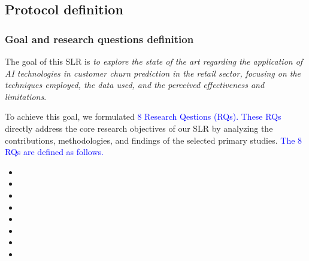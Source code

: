 \subsection{Protocol definition}
\label{subsec:protocol-definition}

\subsubsection{Goal and research questions definition} 
The goal of this SLR is \textit{to explore the state of the art regarding the application of AI technologies in customer churn prediction in the retail sector, focusing on the techniques employed, the data used, and the perceived effectiveness and limitations}. 

To achieve this goal, we formulated \textcolor{blue}{8 Research Qestions (RQs). These RQs} directly address the core research objectives of our SLR by analyzing the contributions, methodologies, and findings of the selected primary studies. \textcolor{blue}{The 8 RQs are defined as follows.} %

\begin{itemize}[label={}, itemsep=1pt, parsep=0pt, topsep=0pt]
    \item \RSRQone
    \item \RSRQtwo
    \item \RSRQthree
    \item \RSRQfour
    \item \RSRQfive
    \item \RSRQsix
    \item \RSRQseven
    \item \RSRQeight
\end{itemize}

